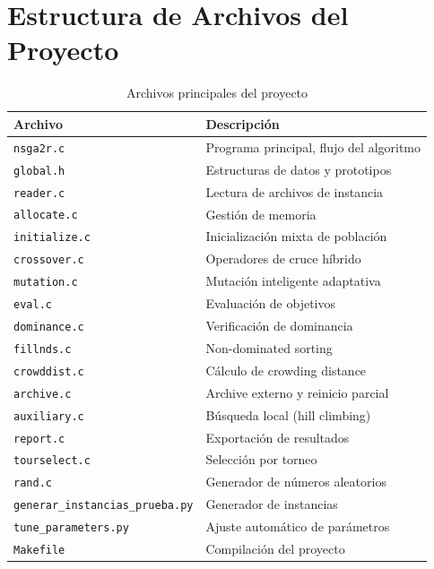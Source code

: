 \documentclass[preprint,12pt,authoryear]{elsarticle}
\begin{document}
\appendix

\section{Estructura de Archivos del Proyecto}

\begin{table}[h]
\centering
\caption{Archivos principales del proyecto}
\begin{tabular}{|l|l|}
\hline
\textbf{Archivo} & \textbf{Descripción} \\
\hline
\texttt{nsga2r.c} & Programa principal, flujo del algoritmo \\
\texttt{global.h} & Estructuras de datos y prototipos \\
\texttt{reader.c} & Lectura de archivos de instancia \\
\texttt{allocate.c} & Gestión de memoria \\
\texttt{initialize.c} & Inicialización mixta de población \\
\texttt{crossover.c} & Operadores de cruce híbrido \\
\texttt{mutation.c} & Mutación inteligente adaptativa \\
\texttt{eval.c} & Evaluación de objetivos \\
\texttt{dominance.c} & Verificación de dominancia \\
\texttt{fillnds.c} & Non-dominated sorting \\
\texttt{crowddist.c} & Cálculo de crowding distance \\
\texttt{archive.c} & Archive externo y reinicio parcial \\
\texttt{auxiliary.c} & Búsqueda local (hill climbing) \\
\texttt{report.c} & Exportación de resultados \\
\texttt{tourselect.c} & Selección por torneo \\
\texttt{rand.c} & Generador de números aleatorios \\
\hline
\texttt{generar\_instancias\_prueba.py} & Generador de instancias \\
\texttt{tune\_parameters.py} & Ajuste automático de parámetros \\
\texttt{Makefile} & Compilación del proyecto \\
\hline
\end{tabular}
\end{table}




\end{document}
